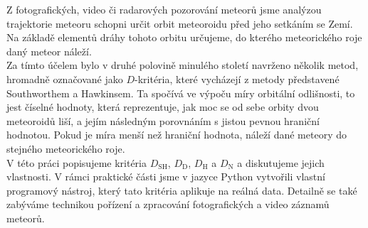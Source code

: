{\small
Z fotografických, video či radarových pozorování meteorů jsme analýzou trajektorie meteoru schopni určit orbit meteoroidu před jeho setkáním se Zemí. Na základě elementů dráhy tohoto orbitu určujeme, do kterého meteorického roje daný meteor náleží.\\
Za tímto účelem bylo v druhé polovině minulého století navrženo několik metod, hromadně označované jako $D$-kritéria, které vycházejí z metody představené Southworthem a Hawkinsem. Ta spočívá ve výpoču míry orbitální odlišnosti, to jest číselné hodnoty, která reprezentuje, jak moc se od sebe orbity dvou meteoroidů liší, a jejím následným porovnáním s jistou pevnou hraniční hodnotou. Pokud je míra menší než hraniční hodnota, náleží dané meteory do stejného meteorického roje.\\
V této práci popisujeme kritéria $D_\text{SH}$, $D_\text{D}$, $D_\text{H}$ a $D_\text{N}$ a diskutujeme jejich vlastnosti. V rámci praktické části jsme v jazyce Python vytvořili vlastní programový nástroj, který tato kritéria aplikuje na reálná data. Detailně se také zabýváme technikou pořízení a zpracování fotografických a video záznamů meteorů.
}
